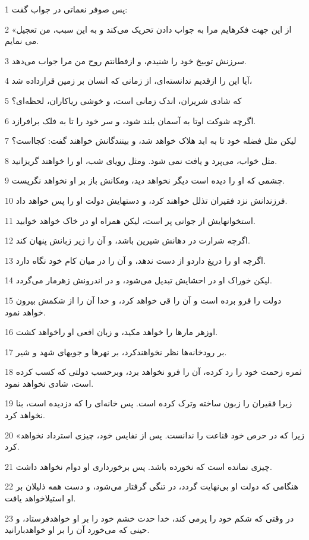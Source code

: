 \par 1 پس صوفر نعماتی در جواب گفت:
\par 2 «از این جهت فکرهایم مرا به جواب دادن تحریک می‌کند و به این سبب، من تعجیل می نمایم.
\par 3 سرزنش توبیخ خود را شنیدم، و ازفطانتم روح من مرا جواب می‌دهد.
\par 4 آیا این را ازقدیم ندانسته‌ای، از زمانی که انسان بر زمین قرارداده شد،
\par 5 که شادی شریران، اندک زمانی است، و خوشی ریاکاران، لحظه‌ای؟
\par 6 اگر‌چه شوکت اوتا به آسمان بلند شود، و سر خود را تا به فلک برافرازد.
\par 7 لیکن مثل فضله خود تا به ابد هلاک خواهد شد، و بینندگانش خواهند گفت: کجااست؟
\par 8 مثل خواب، می‌پرد و یافت نمی شود. ومثل رویای شب، او را خواهند گریزانید.
\par 9 چشمی که او را دیده است دیگر نخواهد دید، ومکانش باز بر او نخواهد نگریست.
\par 10 فرزندانش نزد فقیران تذلل خواهند کرد، و دستهایش دولت او را پس خواهد داد. 
\par 11 استخوانهایش از جوانی پر است، لیکن همراه او در خاک خواهد خوابید.
\par 12 اگر‌چه شرارت در دهانش شیرین باشد، و آن را زیر زبانش پنهان کند.
\par 13 اگر‌چه او را دریغ داردو از دست ندهد، و آن را در میان کام خود نگاه دارد.
\par 14 لیکن خوراک او در احشایش تبدیل می‌شود، و در اندرونش زهرمار می‌گردد.
\par 15 دولت را فرو برده است و آن را قی خواهد کرد، و خدا آن را از شکمش بیرون خواهد نمود.
\par 16 اوزهر مارها را خواهد مکید، و زبان افعی او راخواهد کشت.
\par 17 بر رودخانه‌ها نظر نخواهندکرد، بر نهرها و جویهای شهد و شیر.
\par 18 ثمره زحمت خود را رد کرده، آن را فرو نخواهد برد، وبرحسب دولتی که کسب کرده است، شادی نخواهد نمود.
\par 19 زیرا فقیران را زبون ساخته وترک کرده است. پس خانه‌ای را که دزدیده است، بنا نخواهد کرد.
\par 20 «زیرا که در حرص خود قناعت را ندانست. پس از نفایس خود، چیزی استرداد نخواهد کرد.
\par 21 چیزی نمانده است که نخورده باشد. پس برخورداری او دوام نخواهد داشت.
\par 22 هنگامی که دولت او بی‌نهایت گردد، در تنگی گرفتار می‌شود، و دست همه ذلیلان بر او استیلاخواهد یافت.
\par 23 در وقتی که شکم خود را پرمی کند، خدا حدت خشم خود را بر او خواهدفرستاد، و حینی که می‌خورد آن را بر او خواهدبارانید.
